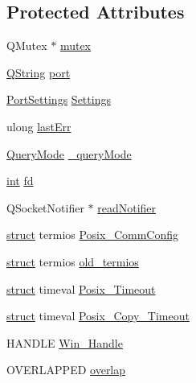 \subsection*{Protected Attributes}
\begin{DoxyCompactItemize}
\item 
Q\-Mutex $\ast$ \hyperlink{class_qext_serial_port_a308d281fcb5c096f259263ef8fea8924}{mutex}
\item 
\hyperlink{group___u_a_v_objects_plugin_gab9d252f49c333c94a72f97ce3105a32d}{Q\-String} \hyperlink{class_qext_serial_port_a5fd2b5c7a55162199121ff572bbee727}{port}
\item 
\hyperlink{struct_port_settings}{Port\-Settings} \hyperlink{class_qext_serial_port_a0f211a568bf58945d6cfdbe81b2788d4}{Settings}
\item 
ulong \hyperlink{class_qext_serial_port_a068360e01b2a7adc7bce904db45459d5}{last\-Err}
\item 
\hyperlink{class_qext_serial_port_a6002128d7351ea9a958d6a6d1fc6b9bd}{Query\-Mode} \hyperlink{class_qext_serial_port_a5c079292fed2f4c283ad88fedf005f11}{\-\_\-query\-Mode}
\item 
\hyperlink{ioapi_8h_a787fa3cf048117ba7123753c1e74fcd6}{int} \hyperlink{class_qext_serial_port_a08fc6251406db64921e535a183aab90b}{fd}
\item 
Q\-Socket\-Notifier $\ast$ \hyperlink{class_qext_serial_port_a3a9103c833808566a3227338abbe09ff}{read\-Notifier}
\item 
\hyperlink{sdlgamepad_8dox_aba655c5729da86df745f0c8e7f9ba8d2}{struct} termios \hyperlink{class_qext_serial_port_a6df36ef68dd1686802899ce3f8200e8a}{Posix\-\_\-\-Comm\-Config}
\item 
\hyperlink{sdlgamepad_8dox_aba655c5729da86df745f0c8e7f9ba8d2}{struct} termios \hyperlink{class_qext_serial_port_a1eb0b02daef68e0d49b8837614726763}{old\-\_\-termios}
\item 
\hyperlink{sdlgamepad_8dox_aba655c5729da86df745f0c8e7f9ba8d2}{struct} timeval \hyperlink{class_qext_serial_port_ab91233846daffd88f3de767b4f677b94}{Posix\-\_\-\-Timeout}
\item 
\hyperlink{sdlgamepad_8dox_aba655c5729da86df745f0c8e7f9ba8d2}{struct} timeval \hyperlink{class_qext_serial_port_af6149c83e334653cc2b33139aec3f733}{Posix\-\_\-\-Copy\-\_\-\-Timeout}
\item 
H\-A\-N\-D\-L\-E \hyperlink{class_qext_serial_port_a82bc5cd954e7becbb48c595724275f82}{Win\-\_\-\-Handle}
\item 
O\-V\-E\-R\-L\-A\-P\-P\-E\-D \hyperlink{class_qext_serial_port_a46b60d5c914dcb4e10ae3027c5c55d13}{overlap}

\end{DoxyCompactItemize}
